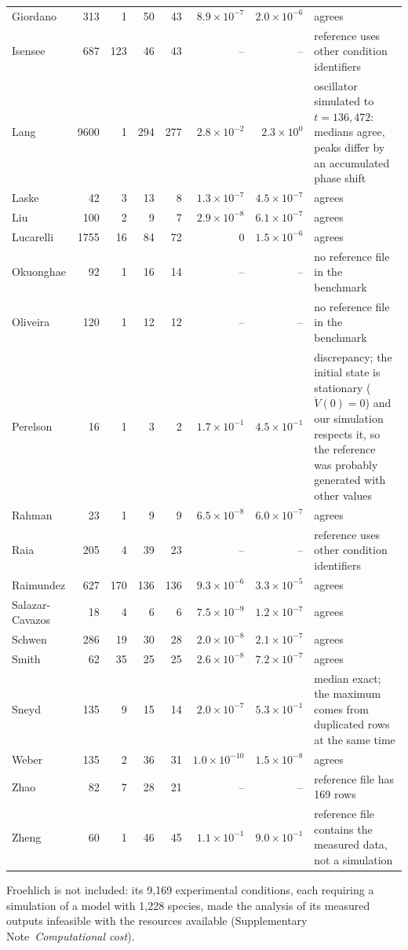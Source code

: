 {\begin{longtable}{@{}>{\raggedright\arraybackslash}p{2.6cm}rrrrrr>{\raggedright\arraybackslash}p{5.3cm}@{}}
Giordano & 313 & 1 & 50 & 43 & $8.9\times10^{-7}$ & $2.0\times10^{-6}$ & agrees \\
Isensee & 687 & 123 & 46 & 43 & -- & -- & reference uses other condition identifiers \\
Lang & 9600 & 1 & 294 & 277 & $2.8\times10^{-2}$ & $2.3\times10^{0}$ & oscillator simulated to $t=136{,}472$: medians agree, peaks differ by an accumulated phase shift \\
Laske & 42 & 3 & 13 & 8 & $1.3\times10^{-7}$ & $4.5\times10^{-7}$ & agrees \\
Liu & 100 & 2 & 9 & 7 & $2.9\times10^{-8}$ & $6.1\times10^{-7}$ & agrees \\
Lucarelli & 1755 & 16 & 84 & 72 & $0$ & $1.5\times10^{-6}$ & agrees \\
Okuonghae & 92 & 1 & 16 & 14 & -- & -- & no reference file in the benchmark \\
Oliveira & 120 & 1 & 12 & 12 & -- & -- & no reference file in the benchmark \\
Perelson & 16 & 1 & 3 & 2 & $1.7\times10^{-1}$ & $4.5\times10^{-1}$ & discrepancy; the initial state is stationary ($\dot V(0)=0$) and our simulation respects it, so the reference was probably generated with other values \\
Rahman & 23 & 1 & 9 & 9 & $6.5\times10^{-8}$ & $6.0\times10^{-7}$ & agrees \\
Raia & 205 & 4 & 39 & 23 & -- & -- & reference uses other condition identifiers \\
Raimundez & 627 & 170 & 136 & 136 & $9.3\times10^{-6}$ & $3.3\times10^{-5}$ & agrees \\
Salazar-Cavazos & 18 & 4 & 6 & 6 & $7.5\times10^{-9}$ & $1.2\times10^{-7}$ & agrees \\
Schwen & 286 & 19 & 30 & 28 & $2.0\times10^{-8}$ & $2.1\times10^{-7}$ & agrees \\
Smith & 62 & 35 & 25 & 25 & $2.6\times10^{-8}$ & $7.2\times10^{-7}$ & agrees \\
Sneyd & 135 & 9 & 15 & 14 & $2.0\times10^{-7}$ & $5.3\times10^{-1}$ & median exact; the maximum comes from duplicated rows at the same time \\
Weber & 135 & 2 & 36 & 31 & $1.0\times10^{-10}$ & $1.5\times10^{-8}$ & agrees \\
Zhao & 82 & 7 & 28 & 21 & -- & -- & reference file has 169 rows \\
Zheng & 60 & 1 & 46 & 45 & $1.1\times10^{-1}$ & $9.0\times10^{-1}$ & reference file contains the measured data, not a simulation \\
\bottomrule \end{longtable}}

Froehlich is not included: its 9,169 experimental conditions, each requiring a simulation of a model with 1,228 species, made the analysis of its measured outputs infeasible with the resources available (Supplementary Note~\emph{Computational cost}).

